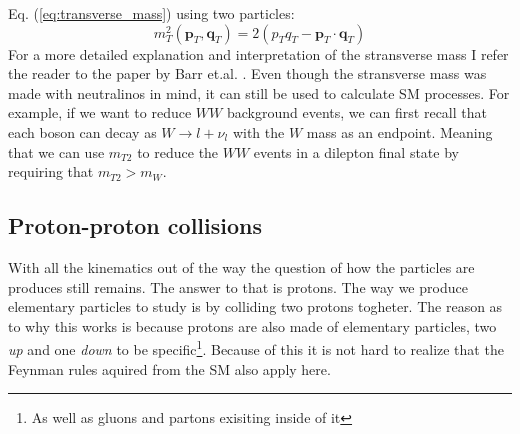 \documentclass[14pt, a4paper]{book}
\begin{document}
Eq. (\ref{eq:transverse_mass}) using two particles:
$$
m_T^2 \left(\mathbf{p}_T, \mathbf{q}_T\right) = 2(p_T q_T - \mathbf{p}_T\cdot\mathbf{q}_T)
$$
For a more detailed explanation and interpretation of the stransverse mass I refer the reader to the paper by Barr et.al. \cite{Barr_2003}. Even though the stransverse mass was made with neutralinos in mind, it can still 
be used to calculate SM processes. For example, if we want to reduce $WW$ background events, we can first recall that each boson can decay as $W\rightarrow l+\nu_l$ with the $W$ mass as an endpoint. 
Meaning that we can use $m_{T2}$ to reduce the $WW$ events in a dilepton final state by requiring that $m_{T2} > m_W$.

\clearpage
\subsection{Proton-proton collisions}
With all the kinematics out of the way the question of how the particles are produces still remains. The answer to that is protons. The way we produce elementary particles to study is by colliding two protons togheter.
The reason as to why this works is because protons are also made of elementary particles, two \textit{up} and one \textit{down} to be specific\footnote{As well as gluons and partons exisiting inside of it}.
Because of this it is not hard to realize that the Feynman rules aquired from the SM also apply here.  





\clearpage
\end{document}

